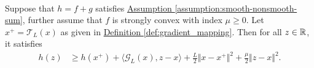 \documentclass[12pt]{article}
\begin{document}
    \begin{lemma}
    \label{lemma:grad_map_linearization}\; \\
        Suppose that $h = f + g$ satisfies 
        \hyperref[assumption:smooth-nonsmooth-sum]{Assumption \ref*{assumption:smooth-nonsmooth-sum}}, 
        further assume that $f$ is strongly convex with index $\mu \ge 0$. 
        Let $x^+ = \mathcal T_L(x)$ as given in 
        \hyperref[def:gradient_mapping]{Definition \ref*{def:gradient_mapping}}. 
        Then for all $z \in \mathbb R$, it satisfies
        \begin{align*}
            h(z) &\ge 
            h(x^+) + 
            \langle \mathcal G_L (x), z - x\rangle 
            + 
            \frac{L}{2}\Vert x - x^+\Vert^2 + \frac{\mu}{2}
            \Vert z - x\Vert^2. 
        \end{align*}
    \end{lemma}
\end{document}
